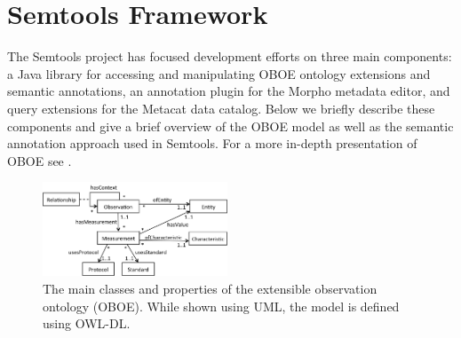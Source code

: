 
\section{Semtools Framework}
\label{sec:framework}

The Semtools project has focused development efforts on three main
components: a Java library for accessing and manipulating OBOE
ontology extensions and semantic annotations, an annotation plugin for
the Morpho metadata editor, and query extensions for the Metacat data
catalog. Below we briefly describe these components and give a brief
overview of the OBOE model as well as the semantic annotation approach
used in Semtools. For a more in-depth presentation of OBOE see
\cite{madin07:_ontol_for_descr_and_synth,bowers08}.

\begin{figure}[!t]
  \centering
  \includegraphics[width=0.49\textwidth]{images/oboe}
  \caption{The main classes and properties of the extensible
    observation ontology (OBOE). While shown using UML, the model is
    defined using OWL-DL.}
  \label{fig:oboe}
\end{figure}

